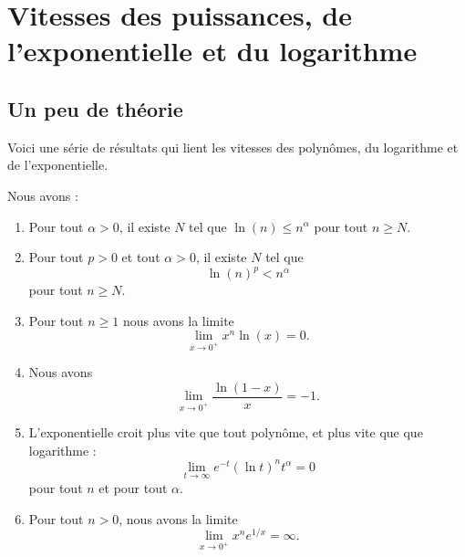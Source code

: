 \section{Vitesses des puissances, de l'exponentielle et du logarithme}

\subsection{Un peu de théorie}

Voici une série de résultats qui lient les vitesses des polynômes, du logarithme et de l'exponentielle.

\begin{proposition}     \label{PROPooKVIFooGdKpfP}
	Nous avons :
	\begin{enumerate}
		\item   \label{ITEMooCDSQooSIctbz}
		      Pour tout \( \alpha>0\), il existe \( N\) tel que \( \ln(n)\leq n^{\alpha}\) pour tout \( n\geq N\).
		\item       \label{ITEMooZMAWooTbDNAd}
		      Pour tout \( p>0\) et tout \( \alpha>0\), il existe \( N\) tel que
		      \begin{equation}
			      \ln(n)^p<n^{\alpha}
		      \end{equation}
		      pour tout \( n\geq N\).
		\item       \label{ITEMooBLNOooZQNTfd}
		      Pour tout \( n\geq 1\) nous avons la limite
		      \begin{equation}
			      \lim_{x\to 0^+} x^n\ln(x)=0.
		      \end{equation}
		\item       \label{ITEMooMLNMooAyJTox}
		      Nous avons
		      \begin{equation}
			      \lim_{x\to 0^+} \frac{ \ln(1-x) }{ x }=-1.
		      \end{equation}
		\item       \label{ITEMooIQEKooBionsK}
		      L'exponentielle croit plus vite que tout polynôme, et plus vite que que logarithme :
		      \begin{equation}        \label{EqExpDecrtPlusVite}
			      \lim_{t\to\infty} e^{-t}(\ln t)^{n}t^{\alpha}=0
		      \end{equation}
		      pour tout \( n\) et pour tout \( \alpha\).
		\item       \label{ITEMooDUQWooNvAvmR}
		      Pour tout \( n>0\), nous avons la limite
		      \begin{equation}
			      \lim_{x\to 0^+} x^n e^{1/x}=\infty.
		      \end{equation}
	\end{enumerate}
\end{proposition}

